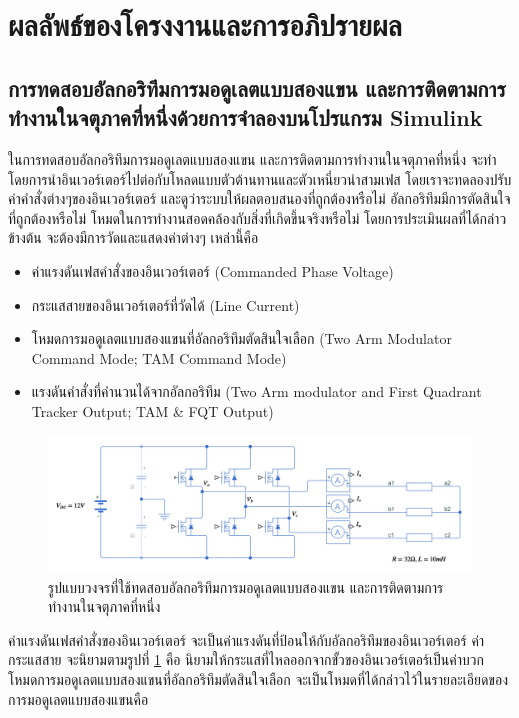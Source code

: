 \documentclass[11pt,a4paper]{article}
\begin{document}
\newpage

\section{ผลลัพธ์ของโครงงานและการอภิปรายผล}

\subsection{การทดสอบอัลกอริทึมการมอดูเลตแบบสองแขน และการติดตามการทำงานในจตุภาคที่หนึ่งด้วยการจำลองบนโปรแกรม Simulink}

ในการทดสอบอัลกอริทึมการมอดูเลตแบบสองแขน และการติดตามการทำงานในจตุภาคที่หนึ่ง จะทำโดยการนำอินเวอร์เตอร์ไปต่อกับโหลดแบบตัวต้านทานและตัวเหนี่ยวนำสามเฟส โดยเราจะทดลองปรับค่าคำสั่งต่างๆของอินเวอร์เตอร์ และดูว่าระบบให้ผลตอบสนองที่ถูกต้องหรือไม่ อัลกอริทึมมีการตัดสินใจที่ถูกต้องหรือไม่ โหมดในการทำงานสอดคล้องกับสิ่งที่เกิดขึ้นจริงหรือไม่ โดยการประเมินผลที่ได้กล่าวข้างต้น จะต้องมีการวัดและแสดงค่าต่างๆ เหล่านี้คือ

\begin{itemize}
    \item ค่าแรงดันเฟสคำสั่งของอินเวอร์เตอร์ (Commanded Phase Voltage)
    \item กระแสสายของอินเวอร์เตอร์ที่วัดได้ (Line Current)
    \item โหมดการมอดูเลตแบบสองแขนที่อัลกอริทึมตัดสินใจเลือก (Two Arm Modulator Command Mode; TAM Command Mode)
    \item แรงดันคำสั่งที่คำนวนได้จากอัลกอริทึม (Two Arm modulator and First Quadrant Tracker Output; TAM \& FQT Output)
\end{itemize}

\begin{figure}[H]
    \centering
    \includegraphics[width=\textwidth]{ildef.png}
    \caption{รูปแบบวงจรที่ใช้ทดสอบอัลกอริทึมการมอดูเลตแบบสองแขน และการติดตามการทำงานในจตุภาคที่หนึ่ง}
    \label{ildef}
\end{figure}

ค่าแรงดันเฟสคำสั่งของอินเวอร์เตอร์ จะเป็นค่าแรงดันที่ป้อนให้กับอัลกอริทึมของอินเวอร์เตอร์ \newline ค่ากระแสสาย จะนิยามตามรูปที่ \ref{ildef} คือ นิยามให้กระแสที่ไหลออกจากขั้วของอินเวอร์เตอร์เป็นค่าบวก \newline โหมดการมอดูเลตแบบสองแขนที่อัลกอริทึมตัดสินใจเลือก จะเป็นโหมดที่ได้กล่าวไว้ในรายละเอียดของการมอดูเลตแบบสองแขนคือ
\end{document}
